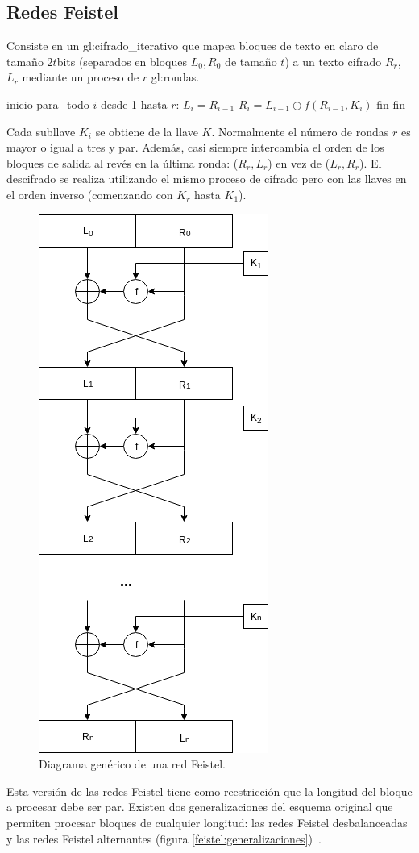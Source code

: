 %
%

\subsection{Redes Feistel}
\label{sec:red_feistel}

Consiste en un \gls{gl:cifrado_iterativo} que mapea bloques de
texto en claro de tamaño $2t$bits (separados en bloques
$L_0, R_0$ de tamaño $t$) a un texto cifrado $R_r$, $L_r$
mediante un proceso de $r$ \glspl{gl:ronda}.

\begin{pseudocodigo}[caption={Feistel, cifrado.}, label={feistel:1}]
    inicio
    para_todo $i$ desde 1 hasta $r$:
      $L_i = R_{i-1}$
      $R_i = L_{i-1} \oplus f(R_{i-1}, K_i)$
    fin
    fin
\end{pseudocodigo}

Cada subllave $K_i$ se obtiene de la llave $K$. Normalmente el número de rondas
$r$ es mayor o igual a tres y par. Además, casi siempre intercambia el orden de
los bloques de salida al revés en la última ronda: ($R_r, L_r$) en vez de
($L_r, R_r$). El descifrado se realiza utilizando el mismo proceso de cifrado
pero con las llaves en el orden inverso (comenzando con $K_r$ hasta $K_1$).

\begin{figure}
  \begin{center}
    \includegraphics[width=0.25\linewidth]
      {../../../../diagramas_comunes/redes_feistel/feistel}
     \caption{Diagrama genérico de una red Feistel.}
     \label{feistel}
   \end{center}
\end{figure}

Esta versión de las redes Feistel tiene como reestricción que la longitud
del bloque a procesar debe ser par. Existen dos generalizaciones del esquema
original que permiten procesar bloques de cualquier longitud: las redes Feistel
desbalanceadas y las redes Feistel alternantes (figura
\ref{feistel:generalizaciones})~\cite{sinopsis_rogaway}.

